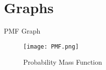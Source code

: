 \documentclass{beamer}
\begin{document}
\section{Graphs}
\begin{frame}{PMF Graph}
    \begin{figure}[!ht]
		\centering
		\texttt{[image: PMF.png]}
		\caption{Probability Mass Function}
		\label{fig1}
	\end{figure}
\end{frame}
\end{document}
